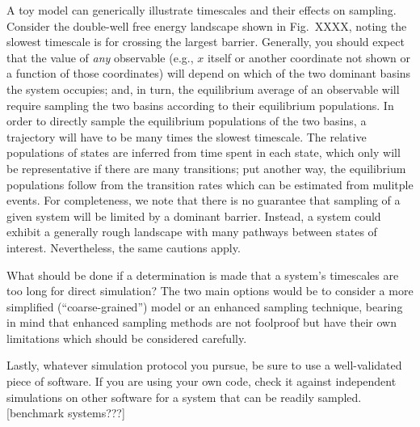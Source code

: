 A toy model can generically illustrate timescales and their effects on sampling.
Consider the double-well free energy landscape shown in Fig.\ XXXX, noting the slowest timescale is for crossing the largest barrier.
Generally, you should expect that the value of \emph{any} observable (e.g., $x$ itself or another coordinate not shown or a function of those coordinates) will depend on which of the two dominant basins the system occupies; and, in turn, the equilibrium average of an observable will require sampling the two basins according to their equilibrium populations.
In order to directly sample the equilibrium populations of the two basins, a trajectory will have to be many times the slowest timescale.
The relative populations of states are inferred from time spent in each state, which only will be representative if there are many transitions;
put another way, the equilibrium populations follow from the transition rates \cite{Zuckerman2011} which can be estimated from mulitple events.
For completeness, we note that there is no guarantee that sampling of a given system will be limited by a dominant barrier.  
Instead, a system could exhibit a generally rough landscape with many pathways between states of interest.
Nevertheless, the same cautions apply.

What should be done if a determination is made that a system's timescales are too long for direct simulation?
The two main options would be to consider a more simplified (``coarse-grained'') model or an enhanced sampling technique, bearing in mind that enhanced sampling methods are not foolproof but have their own limitations which should be considered carefully.

Lastly, whatever simulation protocol you pursue, be sure to use a well-validated piece of software.
If you are using your own code, check it against independent simulations on other software for a system that can be readily sampled.
[benchmark systems???]

